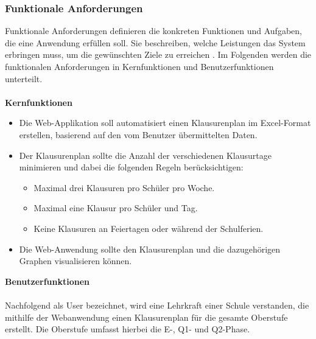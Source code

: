 \subsubsection{Funktionale Anforderungen}
Funktionale Anforderungen definieren die konkreten Funktionen und Aufgaben, die eine Anwendung erfüllen soll. Sie beschreiben, welche Leistungen das System erbringen muss, um die gewünschten Ziele zu erreichen \parencite{anforderungen}. Im Folgenden werden die funktionalen Anforderungen in Kernfunktionen und Benutzerfunktionen unterteilt.\\\\
\textbf{Kernfunktionen}
\begin{itemize}
    \item Die Web-Applikation soll automatisiert einen Klausurenplan im Excel-Format erstellen, basierend auf den vom Benutzer übermittelten Daten.

    \item Der Klausurenplan sollte die Anzahl der verschiedenen Klausurtage minimieren und dabei die folgenden Regeln berücksichtigen:
    \begin{itemize}
        \item Maximal drei Klausuren pro Schüler pro Woche.
        \item Maximal eine Klausur pro Schüler und Tag.
        \item Keine Klausuren an Feiertagen oder während der Schulferien.
    \end{itemize}

    \item Die Web-Anwendung sollte den Klausurenplan und die dazugehörigen Graphen visualisieren können.
\end{itemize}
\textbf{Benutzerfunktionen}\\\\
Nachfolgend als \glqq User\grqq{} bezeichnet, wird eine Lehrkraft einer Schule verstanden, die mithilfe der Webanwendung einen Klausurenplan für die gesamte Oberstufe erstellt. Die Oberstufe umfasst hierbei die E-, Q1- und Q2-Phase.
